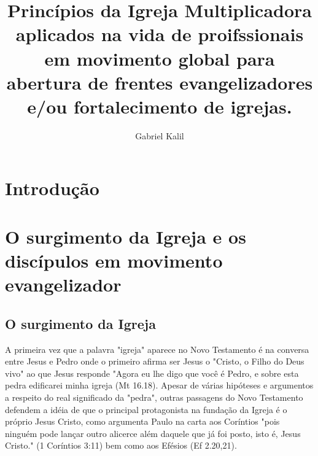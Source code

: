 \documentclass[
	12pt,				%
	openright,			%
	twoside,			%
	a4paper,			%
	english,			%
	french,				%
	spanish,			%
	brazil				%
	]{abntex2}
\title{Princípios da Igreja Multiplicadora aplicados na vida de proifssionais em movimento global para abertura de frentes evangelizadores e/ou fortalecimento de igrejas.}
\author{Gabriel Kalil}
\date{ }
\begin{document}
  
\maketitle
  
\tableofcontents

\chapter{Introdução}


\chapter{O surgimento da Igreja e os discípulos em movimento evangelizador}


\section{O surgimento da Igreja}
   
A primeira vez que a palavra "igreja" aparece no Novo Testamento é na conversa entre Jesus e Pedro onde o primeiro afirma ser Jesus o "Cristo, o Filho do Deus vivo" ao que Jesus responde "Agora eu lhe digo que você é Pedro, e sobre esta pedra edificarei minha igreja (Mt 16.18). Apesar de várias hipóteses e argumentos a respeito do real significado da "pedra", outras passagens do Novo Testamento defendem a idéia de que o principal protagonista na fundação da Igreja é o próprio Jesus Cristo, como argumenta Paulo na carta aos Coríntios
"pois ninguém pode lançar outro alicerce além daquele que já foi posto, isto é, Jesus Cristo." (1 Coríntios 3:11) bem como aos Efésios (Ef 2.20,21). 

\end{document}
